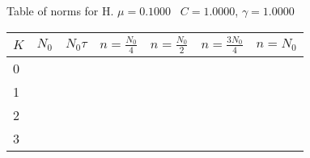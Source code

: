 \begin{center}
Table of norms for H. $\mu = 0.1000$ \, $C = 1.0000$, $\gamma = 1.0000$
  
\begin{tabular}{|p{0.8in}|p{0.8in}|p{0.8in}|p{0.8in}|p{0.8in}|p{0.8in}|p{0.8in}|} \hline
$K$ &$N_0$ &$N_0 \tau$ &$n = \frac{N_0}{4}$ &$n = \frac{N_0}{2}$ &$n = \frac{3N_0}{4}$ &$n = N_0$ \\ \hline 
0 & & & & & & \\ \hline 
1 & & & & & & \\ \hline 
2 & & & & & & \\ \hline 
3 & & & & & & \\ \hline 

\end{tabular}\\[20pt]
\end{center}
